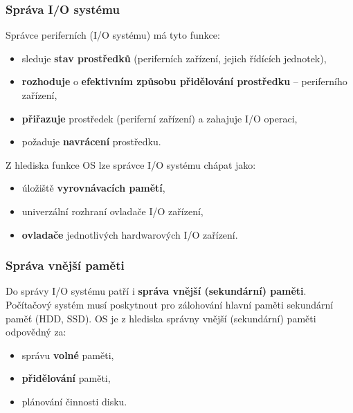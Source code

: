 \subsubsection{Správa I/O systému}
Správce periferních (I/O systému) má tyto funkce:
\begin{itemize}
	\item sleduje \textbf{stav prostředků }(periferních zařízení, jejich řídících jednotek),
	\item \textbf{rozhoduje} o\textbf{ efektivním způsobu přidělování prostředku} -- periferního zařízení,
	\item \textbf{přiřazuje} prostředek (periferní zařízení) a zahajuje I/O operaci,
	\item požaduje \textbf{navrácení} prostředku.
\end{itemize}
Z hlediska funkce OS lze správce I/O systému chápat jako:
\begin{itemize}
	\item úložiště \textbf{vyrovnávacích pamětí},
	\item univerzální rozhraní ovladače I/O zařízení,
	\item \textbf{ovladače} jednotlivých hardwarových I/O zařízení.
\end{itemize}

\subsubsection{Správa vnější paměti}
Do správy I/O systému patří i \textbf{správa vnější (sekundární) paměti}. Počítačový systém musí poskytnout pro zálohování hlavní paměti sekundární paměť (HDD, SSD). OS je z hlediska správny vnější (sekundární) paměti odpovědný za:
\begin{itemize}
	\item správu \textbf{volné} paměti,
	\item \textbf{přidělování} paměti,
	\item plánování činnosti disku.
\end{itemize}

